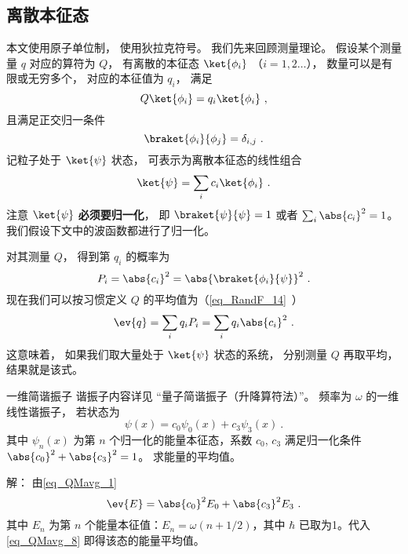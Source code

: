 
\begin{issues}
\issueTODO 
\end{issues}


\subsection{离散本征态}

本文使用原子单位制， 使用狄拉克符号。 我们先来回顾测量理论。 假设某个测量量 $q$ 对应的算符为 $Q$， 有离散的本征态 $\ket{\phi_i}$ （$i = 1,2\dots$）， 数量可以是有限或无穷多个， 对应的本征值为 $q_i$， 满足
\begin{equation}\label{eq_QMavg_3}
Q\ket{\phi_i} = q_i \ket{\phi_i}~,
\end{equation}
且满足正交归一条件
\begin{equation}\label{eq_QMavg_4}
\braket{\phi_i}{\phi_j} = \delta_{i,j}~.
\end{equation}
记粒子处于 $\ket{\psi}$ 状态， 可表示为离散本征态的线性组合
\begin{equation}\label{eq_QMavg_2}
\ket{\psi} = \sum_i c_i \ket{\phi_i}~.
\end{equation}
注意 $\ket{\psi}$ \textbf{必须要归一化}， 即 $\braket{\psi}{\psi} = 1$ 或者 $\sum_i \abs{c_i}^2 = 1$。 我们假设下文中的波函数都进行了归一化。

对其测量 $Q$， 得到第 $q_i$ 的概率为
\begin{equation}
P_i = \abs{c_i}^2 = \abs{\braket{\phi_i}{\psi}}^2~.
\end{equation}
现在我们可以按习惯定义 $Q$ 的平均值为（\autoref{eq_RandF_14}~）
\begin{equation}\label{eq_QMavg_1}
\ev{q} = \sum_i q_i P_i = \sum_i q_i \abs{c_i}^2~.
\end{equation}
这意味着， 如果我们取大量处于 $\ket{\psi}$ 状态的系统， 分别测量 $Q$ 再取平均， 结果就是该式。

\begin{example}{一维简谐振子}
谐振子内容详见 “量子简谐振子（升降算符法）”。 频率为 $\omega$ 的一维线性谐振子， 若状态为
\begin{equation}
\psi(x)=c_0 \psi_0(x)+c_3\psi_3(x)~.
\end{equation}
其中 $\psi_n(x)$ 为第 $n$ 个归一化的能量本征态，系数 $c_0$, $c_3$ 满足归一化条件 $\abs{c_0}^2+\abs{c_3}^2 = 1$。 求能量的平均值。

解： 由\autoref{eq_QMavg_1}
\begin{equation}\label{eq_QMavg_8}
\ev{E}=\abs{c_0}^2 E_0+\abs{c_3}^2 E_3~.
\end{equation}
其中 $E_n$ 为第 $n$ 个能量本征值：$E_n=\omega(n+1/2)$，其中 $\hbar$ 已取为1。代入\autoref{eq_QMavg_8} 即得该态的能量平均值。
\end{example}

